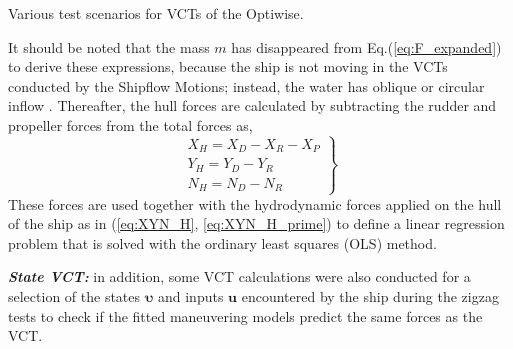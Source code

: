 \begin{table}[H]
    \centering
    \small
    \caption{Various test scenarios for VCTs of the Optiwise.}
    \label{tab:VCT_optiwise}
\end{table}
%    




It should be noted that the mass $m$ has disappeared from Eq.(\ref{eq:F_expanded}) to derive these expressions, because the ship is not moving in the VCTs conducted by the Shipflow Motions; instead, the water has oblique or circular inflow \citep{roychoudhuryCFDSimulationsSteady2017}.
Thereafter, the hull forces are calculated by subtracting the rudder and propeller forces from the total forces as,
\begin{equation}
    \label{eq:X_H_VCT}
    \left.\begin{aligned}
    X_H = X_D - X_R - X_P \\
    Y_H = Y_D - Y_R \\
    N_H = N_D - N_R
    \end{aligned}\right\}
\end{equation}
These forces are used together with the hydrodynamic forces applied on the hull of the ship as in (\autoref{eq:XYN_H}, \autoref{eq:XYN_H_prime}) to define a linear regression problem that is solved with the ordinary least squares (OLS) method.

\textbf{\textit{State VCT:}} in addition, some VCT calculations were also conducted for a selection of the states $\pmb{\bm{\upsilon}}$ and inputs $\mathbf{u}$ encountered by the ship during the zigzag tests to check if the fitted maneuvering models predict the same forces as the VCT.